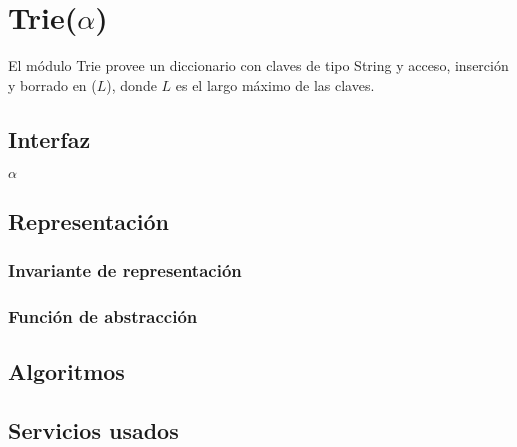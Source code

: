 \section{Trie($\alpha$)}

El módulo Trie provee un diccionario con claves de tipo String y acceso, inserción y borrado en \bigo($L$), donde $L$ es el largo máximo de las claves.

\subsection{Interfaz}

\begin{iparamformales}{$\alpha$}

\end{iparamformales}

\iusa{}

\subsection{Representación}

\subsubsection{Invariante de representación}

\subsubsection{Función de abstracción}

\subsection{Algoritmos}

\subsection{Servicios usados}


